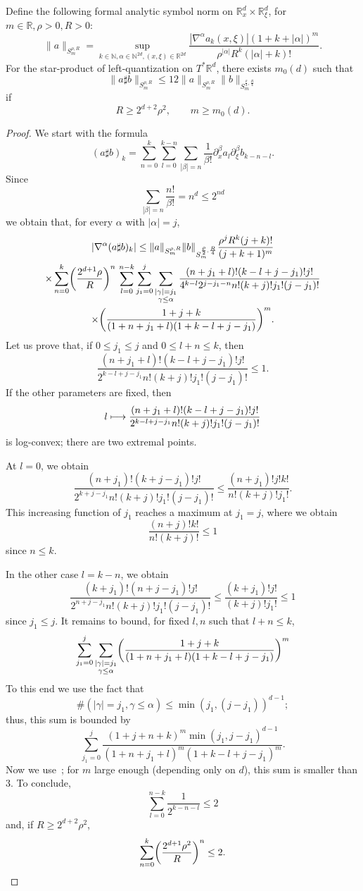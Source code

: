 \documentclass[10pt]{amsart}
\theoremstyle{definition}\newtheorem{defi}[theo]{Definition}\newtheorem{rema}[theo]{Remark}\newtheorem{exam}[theo]{Example}\newtheorem{exem}[theo]{Example}\newtheorem{nota}[theo]{Notation}
\newcommand\1{\mathds{1}}
\newcommand{\R}{\mathbb{R}}
\newcommand{\N}{\mathbb{N}}
\let\oldmapsto\mapsto
\renewcommand*{\mapsto}{\mathchoice{\longmapsto}{\oldmapsto}{\oldmapsto}{\oldmapsto}}
\let\originalleft\left
\let\originalright\right
\renewcommand{\left}{\mathopen{}\mathclose\bgroup\originalleft}
\renewcommand{\right}{\aftergroup\egroup\originalright}
\begin{document}
\begin{prop}\label{prop:composition-formal}
Define the following formal analytic symbol norm on $\R^{d}_x\times \R^d_{\xi}$, for $m\in \R, \rho>0,R>0$:
\[
\|a\|_{S^{\rho,R}_m}=\sup_{k\in \N, \alpha\in \N^{2d}, (x,\xi)\in
\R^{2d}}\frac{|\nabla^{\alpha}a_k(x,\xi)|(1+k+|\alpha|)^m}{\rho^{|\alpha|}R^k(|\alpha|+k)!}.
\]
For the star-product of left-quantization on $T^*\R^d$, there exists $m_0(d)$ such that
\[
\|a\sharp b\|_{S^{\rho,R}_m}\leq 12\|a\|_{S^{\rho,R}_m}\|b\|_{S^{\frac{\rho}2,\frac R4}_m}
\]
if
\[
R\geq 2^{d+2}\rho^2, \qquad m\geq m_0(d).
\]
\end{prop}
\begin{proof}
We start with the formula
\[
(a\sharp b)_k=\sum_{n=0}^k\sum_{l=0}^{k-n}\sum_{|\beta|=n}\frac{1}{\beta!}\partial^\beta_xa_l\partial_{\xi}^{\beta}b_{k-n-l}.
\]
Since
\[
\sum_{|\beta|=n}\frac{n!}{\beta!}=n^d\leq 2^{nd}
\]
we obtain that, for every $\alpha$ with $|\alpha|=j$,
\begin{multline*}
\left|\nabla^{\alpha}(a\sharp b)_k\right|\leq
\|a\|_{S^{\rho,R}_m}\|b\|_{S^{\frac{\rho}2,\frac R4}_m}\frac{\rho^jR^k(j+k)!}{(j+k+1)^m} \\
\times \sum_{n=0}^k\left(\frac{2^{d+1}\rho}{R}\right)^n\,\sum_{l=0}^{n-k}\sum_{j_1=0}^j\sum_{\substack{|\gamma|=j_1\\
\gamma\leq
\alpha}}
\frac{(n+j_1+l)!(k-l+j-j_1)!j!}{4^{k-l}2^{j-j_1-n}n!(k+j)!j_1!(j-j_1)!}
\\ \times \left(\frac{1+j+k}{(1+n+j_1+l)(1+k-l+j-j_1)}\right)^m.
\end{multline*}
Let us prove that, if $0\leq j_1\leq j$ and $0\leq l+n\leq k$, then
\[
\frac{(n+j_1+l)!(k-l+j-j_1)!j!}{2^{k-l+j-j_1}n!(k+j)!j_1!(j-j_1)!}\leq 1.
\]
If the other parameters are fixed, then
\[
l\mapsto
\frac{(n+j_1+l)!(k-l+j-j_1)!j!}{2^{k-l+j-j_1}n!(k+j)!j_1!(j-j_1)!}
\]
is log-convex; there are two extremal points.



At \underline{$l=0$}, we obtain
\[
\frac{(n+j_1)!(k+j-j_1)!j!}{2^{k+j-j_1}n!(k+j)!j_1!(j-j_1)!}\leq
\frac{(n+j_1)!j!k!}{n!(k+j)!j_1!}.
\]
This increasing function of $j_1$ reaches a maximum at $j_1=j$, where we obtain
\[
\frac{(n+j)!k!}{n!(k+j)!}\leq 1
\]
since $n\leq k$.

In the other case \underline{$l=k-n$}, we obtain
\[
\frac{(k+j_1)!(n+j-j_1)!j!}{2^{n+j-j_1}n!(k+j)!j_1!(j-j_1)!}\leq
\frac{(k+j_1)!j!}{(k+j)!j_1!}\leq 1
\]
since $j_1\leq j$. It remains to bound, for fixed $l,n$ such that $l+n\leq k$,
\[
\sum_{j_1=0}^j\sum_{\substack{|\gamma|=j_1\\ \gamma\leq
\alpha}}\left(\frac{1+j+k}{(1+n+j_1+l)(1+k-l+j-j_1)}\right)^m
\]
To this end we use the fact that
\[
\#(|\gamma|=j_1,\gamma\leq \alpha)\leq \min(j_1,(j-j_1))^{d-1};
\]
thus, this sum is bounded by
\[
\sum_{j_1=0}^j\frac{(1+j+n+k)^m\min(j_1,j-j_1)^{d-1}}{(1+n+j_1+l)^m(1+k-l+j-j_1)^m}.
\]
Now we use~\cite[Lemma~2.13]{deleporte_toeplitz_2018}; for $m$ large enough (depending only on $d$), this sum is smaller than $3$. To conclude,
\[
\sum_{l=0}^{n-k}\frac{1}{2^{k-n-l}}\leq 2
\]
and, if $R\geq 2^{d+2}\rho^2$,
\[
\sum_{n=0}^k\left(\frac{2^{d+1}\rho^2}{R}\right)^n\leq 2.\qedhere
\]
\end{proof}
\end{document}
